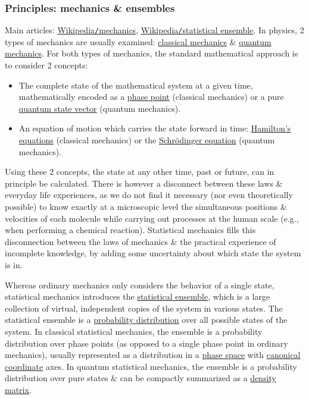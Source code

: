 \documentclass{article}
\begin{document}
\subsubsection{Principles: mechanics \& ensembles}
Main articles: \href{https://en.wikipedia.org/wiki/Mechanics}{Wikipedia{\tt/}mechanics}, \href{https://en.wikipedia.org/wiki/Statistical_ensemble_(mathematical_physics)}{Wikipedia{\tt/}statistical ensemble}. In physics, 2 types of mechanics are usually examined: \href{https://en.wikipedia.org/wiki/Classical_mechanics}{classical mechanics} \& \href{https://en.wikipedia.org/wiki/Quantum_mechanics}{quantum mechanics}. For both types of mechanics, the standard mathematical approach is to consider 2 concepts:
\begin{itemize}
	\item The complete state of the mathematical system at a given time, mathematically encoded as a \href{https://en.wikipedia.org/wiki/Phase_space}{phase point} (classical mechanics) or a pure \href{https://en.wikipedia.org/wiki/Quantum_state_vector}{quantum state vector} (quantum mechanics).
	\item An equation of motion which carries the state forward in time: \href{https://en.wikipedia.org/wiki/Hamiltonian_mechanics}{Hamilton's equations} (classical mechanics) or the \href{https://en.wikipedia.org/wiki/Schr%C3%B6dinger_equation}{Schr\"odinger equation} (quantum mechanics).
\end{itemize}
Using these 2 concepts, the state at any other time, past or future, can in principle be calculated. There is however a disconnect between these laws \& everyday life experiences, as we do not find it necessary (nor even theoretically possible) to know exactly at a microscopic level the simultaneous positions \& velocities of each molecule while carrying out processes at the human scale (e.g., when performing a chemical reaction). Statistical mechanics fills this disconnection between the laws of mechanics \& the practical experience of incomplete knowledge, by adding some uncertainty about which state the system is in.

Whereas ordinary mechanics only considers the behavior of a single state, statistical mechanics introduces the \href{https://en.wikipedia.org/wiki/Statistical_ensemble_(mathematical_physics)}{statistical ensemble}, which is a large collection of virtual, independent copies of the system in various states. The statistical ensemble is a \href{https://en.wikipedia.org/wiki/Probability_distribution}{probability distribution} over all possible states of the system. In classical statistical mechanics, the ensemble is a probability distribution over phase points (as opposed to a single phase point in ordinary mechanics), usually represented as a distribution in a \href{https://en.wikipedia.org/wiki/Phase_space}{phase space} with \href{https://en.wikipedia.org/wiki/Canonical_coordinates}{canonical coordinate} axes. In quantum statistical mechanics, the ensemble is a probability distribution over pure states \& can be compactly summarized as a \href{https://en.wikipedia.org/wiki/Density_matrix}{density matrix}.
\end{document}
